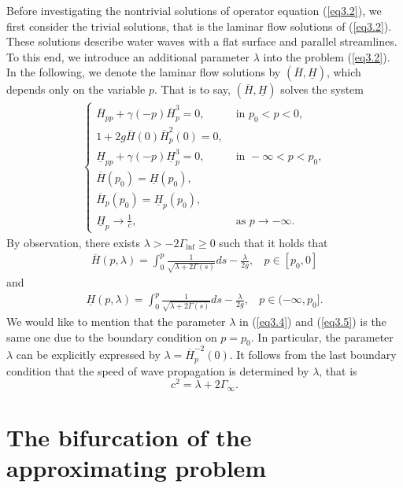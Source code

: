 \documentclass[11pt,reqno]{amsart}
\numberwithin{equation}{section}
\theoremstyle{definition}
\theoremstyle{remark}
\begin{document}
Before investigating the nontrivial solutions of operator equation
(\ref{eq3.2}), we first consider the trivial solutions, that is the
laminar flow solutions of (\ref{eq3.2}). These solutions describe
water waves with a flat surface and parallel streamlines. To this
end, we introduce an additional parameter $\lambda$ into the problem
(\ref{eq3.2}). In the following, we denote the laminar flow
solutions by $(\overline{H},\underline{H})$, which depends only on
the variable $p$. That is to say, $(\overline{H},\underline{H})$
solves the system
\begin{eqnarray}
\left\{\begin{array}{llll}
{\overline{H}_{pp}+\gamma(-p)\overline{H}_p^3=0},  & {\text { in } p_0<p<0}, \\
{1+2g\overline{H}(0)\overline{H}_{p}^{2}(0)=0},  \\
{\underline{H}_{pp}+\gamma(-p)\underline{H}_p^3=0},  & {\text { in } -\infty<p<p_0}, \\
{\overline{H}(p_0)=\underline{H}(p_0)}, \\
{\overline{H}_p(p_0)=\underline{H}_p(p_0)}, \\
{\underline{H}_p\rightarrow \frac{1}{c}}, & {\text { as }
p\rightarrow -\infty}.\end{array}\right. \label{eq3.3}
\end{eqnarray}
By observation, there exists $\lambda>-2\Gamma_{\inf}\geq 0$ such
that it holds that
\begin{eqnarray}
\overline{H}(p,\lambda)=\int_{0}^{p}\frac{1}{\sqrt{\lambda+2\Gamma(s)}}ds-\frac{\lambda}{2g},~~~~
p\in[p_0,0] \label{eq3.4}
\end{eqnarray}
and
\begin{eqnarray}
\underline{H}(p,\lambda)=\int_{0}^{p}\frac{1}{\sqrt{\lambda+2\Gamma(s)}}ds-\frac{\lambda}{2g},~~~~
p\in(-\infty,p_0]. \label{eq3.5}
\end{eqnarray}
We would like to mention that the parameter $\lambda$ in
(\ref{eq3.4}) and (\ref{eq3.5}) is the same one due to the boundary
condition on $p=p_0$. In particular, the parameter $\lambda$ can be
explicitly expressed by $\lambda=\overline{H}_p^{-2}(0)$. It follows
from the last boundary condition that the speed of wave propagation
is determined by $\lambda$, that is
$$
c^2=\lambda+2\Gamma_{\infty}.
$$

\section{The bifurcation of the approximating problem}
\end{document}
